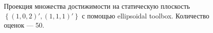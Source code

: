 \documentclass[10pt, a4paper]{article}
\begin{document}
\begin{figure}[H]
\caption{Проекция множества достижимости на статическую плоскость $\left\{(1,0,2)',(1,1,1)'\right\}$ с помощью ellipsoidal toolbox. Количество оценок --- 50.}
\end{figure}
\end{document}
